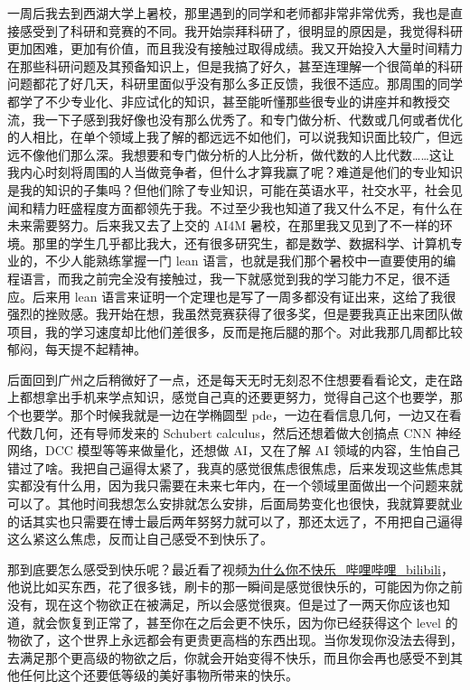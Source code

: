 \documentclass{ctexart}
\theoremstyle{plain}
\theoremstyle{definition}
\theoremstyle{remark}
\begin{document}
一周后我去到西湖大学上暑校，那里遇到的同学和老师都非常非常优秀，我也是直接感受到了科研和竞赛的不同。我开始崇拜科研了，很明显的原因是，我觉得科研更加困难，更加有价值，而且我没有接触过取得成绩。我又开始投入大量时间精力在那些科研问题及其预备知识上，但是我搞了好久，甚至连理解一个很简单的科研问题都花了好几天，科研里面似乎没有那么多正反馈，我很不适应。那周围的同学都学了不少专业化、非应试化的知识，甚至能听懂那些很专业的讲座并和教授交流，我一下子感到我好像也没有那么优秀了。和专门做分析、代数或几何或者优化的人相比，在单个领域上我了解的都远远不如他们，可以说我知识面比较广，但远远不像他们那么深。我想要和专门做分析的人比分析，做代数的人比代数……这让我内心时刻将周围的人当做竞争者，但什么才算我赢了呢？难道是他们的专业知识是我的知识的子集吗？但他们除了专业知识，可能在英语水平，社交水平，社会见闻和精力旺盛程度方面都领先于我。不过至少我也知道了我又什么不足，有什么在未来需要努力。后来我又去了上交的 AI4M 暑校，在那里我又见到了不一样的环境。那里的学生几乎都比我大，还有很多研究生，都是数学、数据科学、计算机专业的，不少人能熟练掌握一门 lean 语言，也就是我们那个暑校中一直要使用的编程语言，而我之前完全没有接触过，我一下就感觉到我的学习能力不足，很不适应。后来用 lean 语言来证明一个定理也是写了一周多都没有证出来，这给了我很强烈的挫败感。我开始在想，我虽然竞赛获得了很多奖，但是要我真正出来团队做项目，我的学习速度却比他们差很多，反而是拖后腿的那个。对此我那几周都比较郁闷，每天提不起精神。

后面回到广州之后稍微好了一点，还是每天无时无刻忍不住想要看看论文，走在路上都想拿出手机来学点知识，感觉自己真的还要更努力，觉得自己这个也要学，那个也要学。那个时候我就是一边在学椭圆型 pde，一边在看信息几何，一边又在看代数几何，还有导师发来的 Schubert calculus，然后还想着做大创搞点 CNN 神经网络，DCC 模型等等来做量化，还想做 AI，又在了解 AI 领域的内容，生怕自己错过了啥。我把自己逼得太紧了，我真的感觉很焦虑很焦虑，后来发现这些焦虑其实都没有什么用，因为我只需要在未来七年内，在一个领域里面做出一个问题来就可以了。其他时间我想怎么安排就怎么安排，后面局势变化也很快，我就算要就业的话其实也只需要在博士最后两年努努力就可以了，那还太远了，不用把自己逼得这么紧这么焦虑，反而让自己感受不到快乐了。

那到底要怎么感受到快乐呢？最近看了视频\href{https://www.bilibili.com/video/BV1D5YRzTEnZ/?spm_id_from=333.1391.0.0&vd_source=b55594d2ba73cdd7666e94ca2cf2fe93}{为什么你不快乐\_哔哩哔哩\_bilibili}，他说比如买东西，花了很多钱，刷卡的那一瞬间是感觉很快乐的，可能因为你之前没有，现在这个物欲正在被满足，所以会感觉很爽。但是过了一两天你应该也知道，就会恢复到正常了，甚至你在之后会更不快乐，因为你已经获得这个 level 的物欲了，这个世界上永远都会有更贵更高档的东西出现。当你发现你没法去得到，去满足那个更高级的物欲之后，你就会开始变得不快乐，而且你会再也感受不到其他任何比这个还要低等级的美好事物所带来的快乐。
\end{document}
